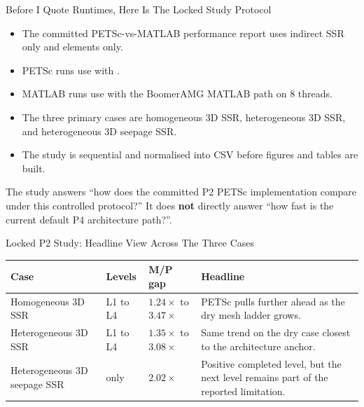 \documentclass[aspectratio=169,10pt]{beamer}
\begin{document}

\begin{frame}{Before I Quote Runtimes, Here Is The Locked Study Protocol}
\small
\begin{softbox}
\begin{itemize}
  \item The committed PETSc-vs-MATLAB performance report uses indirect SSR only and  elements only.
  \item PETSc runs use  with .
  \item MATLAB runs use  with the BoomerAMG MATLAB path on 8 threads.
  \item The three primary cases are homogeneous 3D SSR, heterogeneous 3D SSR, and heterogeneous 3D seepage SSR.
  \item The study is sequential and normalised into CSV before figures and tables are built.
\end{itemize}
\end{softbox}
\vspace{0.18cm}
\begin{callout}
The study answers ``how does the committed P2 PETSc implementation compare under this controlled protocol?'' It does \textbf{not} directly answer ``how fast is the current default P4 architecture path?''.
\end{callout}
\end{frame}

\begin{frame}{Locked P2 Study: Headline View Across The Three Cases}
\small
\begin{tabularx}{\textwidth}{p{}p{}p{}Y}
\toprule
\textbf{Case} & \textbf{Levels} & \textbf{M/P gap} & \textbf{Headline} \\
\midrule
Homogeneous 3D SSR & L1 to L4 & \(1.24\times\) to \(3.47\times\) & PETSc pulls further ahead as the dry mesh ladder grows. \\
Heterogeneous 3D SSR & L1 to L4 & \(1.35\times\) to \(3.08\times\) & Same trend on the dry case closest to the architecture anchor. \\
Heterogeneous 3D seepage SSR &  only & \(2.02\times\) & Positive completed level, but the next level remains part of the reported limitation. \\
\bottomrule
\end{tabularx}
\end{frame}
\end{document}
